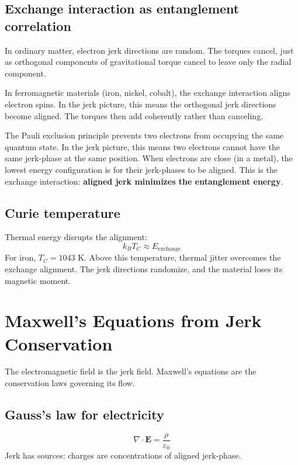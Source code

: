 \documentclass[11pt,letterpaper]{article}
\begin{document}
\subsection{Exchange interaction as entanglement correlation}

In ordinary matter, electron jerk directions are random. The torques cancel,
just as orthogonal components of gravitational torque cancel to leave only the
radial component.

In ferromagnetic materials (iron, nickel, cobalt), the exchange interaction
aligns electron spins. In the jerk picture, this means the orthogonal jerk
directions become aligned. The torques then add coherently rather than canceling.

The Pauli exclusion principle prevents two electrons from occupying the same
quantum state. In the jerk picture, this means two electrons cannot have the
same jerk-phase at the same position. When electrons are close (in a metal),
the lowest energy configuration is for their jerk-phases to be aligned. This
is the exchange interaction: \textbf{aligned jerk minimizes the entanglement energy}.

\subsection{Curie temperature}

Thermal energy disrupts the alignment:
\begin{equation}
  k_B T_C \approx E_{\mathrm{exchange}}
  \label{eq:curie}
\end{equation}
For iron, $T_C = 1043$ K. Above this temperature, thermal jitter overcomes
the exchange alignment. The jerk directions randomize, and the material loses
its magnetic moment.

\section{Maxwell's Equations from Jerk Conservation}

The electromagnetic field is the jerk field. Maxwell's equations are the
conservation laws governing its flow.

\subsection{Gauss's law for electricity}
\begin{equation}
  \nabla \cdot \mathbf{E} = \frac{\rho}{\varepsilon_0}
  \label{eq:gauss_e}
\end{equation}
Jerk has sources: charges are concentrations of aligned jerk-phase.
\end{document}
